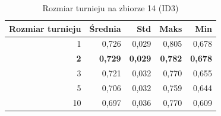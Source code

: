 \begin{table}[htbp]
\centering
\small
\setlength{\tabcolsep}{6pt}
\renewcommand{\arraystretch}{1.2}
\caption{Rozmiar turnieju na zbiorze 14 (ID3)}
\label{tab:ID3_tournament_size_14}
\begin{tabular}{r|r|r|r|r}
\toprule
Rozmiar turnieju & Średnia & Std & Maks & Min \\
\hline
1 & 0,726 & 0,029 & 0,805 & 0,678 \\
\textbf{2} & \textbf{0,729} & \textbf{0,029} & \textbf{0,782} & \textbf{0,678} \\
3 & 0,721 & 0,032 & 0,770 & 0,655 \\
5 & 0,706 & 0,032 & 0,759 & 0,644 \\
10 & 0,697 & 0,036 & 0,770 & 0,609 \\
\bottomrule
\end{tabular}
\end{table}